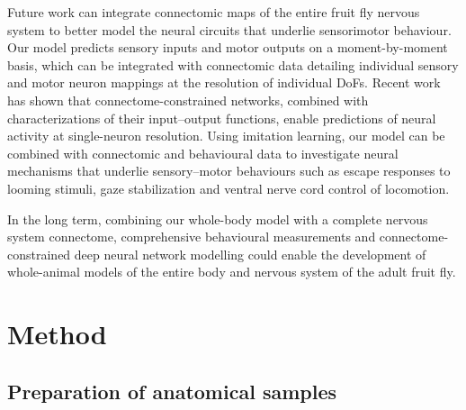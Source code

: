 \documentclass[sn-mathphys-num]{sn-jnl}%
\theoremstyle{thmstyleone}	%
\theoremstyle{thmstyletwo}	%
\theoremstyle{thmstylethree}	%
\begin{document}
Future work can integrate connectomic maps of the entire fruit fly nervous system\cite{dorkenwald2024neuronal,schlegel2024whole,lesser2024synaptic,azevedo2024connectomic,cheong2023transforming,marin2023systematic,takemura2023connectome} to better model the neural circuits that underlie sensorimotor behaviour. 
Our model predicts sensory inputs and motor outputs on a moment-by-moment basis, which can be integrated with connectomic data detailing individual sensory and motor neuron mappings at the resolution of individual DoFs\cite{azevedo2024connectomic}. 
Recent work\cite{lappalainen2024connectome} has shown that connectome-constrained networks, combined with characterizations of their input–output functions, enable predictions of neural activity at single-neuron resolution. 
Using imitation learning, our model can be combined with connectomic and behavioural data to investigate neural mechanisms that underlie sensory–motor behaviours such as escape responses to looming stimuli\cite{card2012escape}, gaze stabilization\cite{cruz2023multilevel} and ventral nerve cord control of locomotion.


In the long term, combining our whole-body model with a complete nervous system connectome, comprehensive behavioural measurements and connectome-constrained deep neural network modelling\cite{lappalainen2024connectome,mi2021connectome} could enable the development of whole-animal models of the entire body and nervous system of the adult fruit fly.



\section{Method} \label{sec:method}

\subsection{Preparation of anatomical samples}
\end{document}
